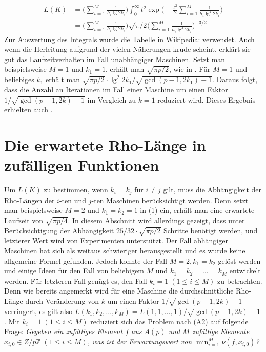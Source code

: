 \documentclass[a4paper, 10pt, ngerman]{article}
\newcommand{\Z}{\mathbb{Z}}
\begin{document}
\begin{align}
    L(K)
     & = \Bigg ( \sum_{i = 1}^M \frac 1 {h_i \lg 2k_i} \Bigg ) \int_{0}^{\infty} t^2 \exp \Bigg (- \frac {t^2} 2 \sum_{i = 1}^M \frac 1 {h_i \lg^2 2k_i} \Bigg ) \nonumber \\
     & = \Bigg ( \sum_{i = 1}^M \frac 1 {h_i \lg 2k_i} \Bigg ) \sqrt {\pi/2} \Bigg (\sum_{i = 1}^M \frac 1 {h_i \lg^2 2k_i} \Bigg )^{-3/2}
\end{align}
Zur Auswertung des Integrals wurde die Tabelle in Wikipedia: \cite{gint} verwendet. Auch wenn die Herleitung aufgrund der vielen Näherungen krude scheint, erklärt sie gut das Laufzeitverhalten im Fall unabhängiger Maschinen. Setzt man beispielsweise $M = 1$ und $k_1 = 1$, erhält man $\sqrt{\pi p / 2}$, wie in \cite{pol75}. Für $M = 1$ und beliebiges $k_1$ erhält man $\sqrt{\pi p / 2} \cdot \lg^2 2k_1 / \sqrt{\gcd(p-1, 2k_1) - 1}$. Daraus folgt, dass die Anzahl an Iterationen im Fall einer Maschine um einen Faktor $1/\sqrt{\gcd(p - 1, 2k) - 1}$ im Vergleich zu $k = 1$ reduziert wird. Dieses Ergebnis erhielten auch \cite{bp81}.

\section{Die erwartete Rho-Länge in zufälligen Funktionen}

Um $L(K)$ zu bestimmen, wenn $k_i = k_j$ für $i \ne j$ gilt, muss die Abhängigkeit der Rho-Längen der $i$-ten und $j$-ten Maschinen berücksichtigt werden. Denn setzt man beispielsweise $M = 2$ und $k_1 = k_2 = 1$ in (1) ein, erhält man eine erwartete Laufzeit von $\sqrt {\pi p / 4}$. In diesem Abschnitt wird allerdings gezeigt, dass unter Berücksichtigung der Abhängigkeit $25/32 \cdot \sqrt{\pi p / 2}$ Schritte benötigt werden, und letzterer Wert wird von Experimenten unterstützt. Der Fall abhängiger Maschinen hat sich als weitaus schwieriger herausgestellt und es wurde keine allgemeine Formel gefunden. Jedoch konnte der Fall $M = 2, k_1 = k_2$ gelöst werden und einige Ideen für den Fall von beliebigem $M$ und $k_1 = k_2 = \dots = k_M$ entwickelt werden. Für letzteren Fall genügt es, den Fall $k_i = 1 \; (1 \le i \le M)$ zu betrachten. Denn wie bereits angemerkt wird für eine Maschine die durchschnittliche Rho-Länge durch Veränderung von $k$ um einen Faktor $1 / \sqrt {\gcd(p - 1, 2k) - 1}$ verringert, es gilt also $L(k_1, k_2, \dots, k_M) = L(1, 1, \dots, 1) / \sqrt{\gcd(p - 1, 2k)-1}$. Mit $k_i = 1 \; (1 \le i \le M)$ reduziert sich das Problem nach (A2) auf folgende Frage: \emph{Gegeben ein zufälliges Element $f$ aus $A(p)$ und $M$ zufällige Elemente $x_{i, 0} \in Z/p\Z \; (1 \le i \le M)$, was ist der Erwartungswert von $\min_{i = 1}^M \nu(f, x_{i, 0})$?}
\end{document}
